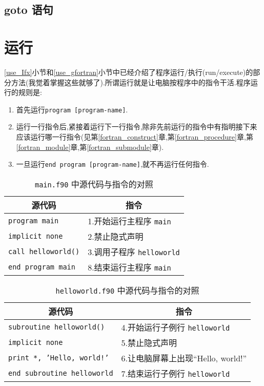 \subsection{goto 语句}

\section{运行}\label{run_fortran}


\ref{use_Ifx}小节和\ref{use_gfortran}小节中已经介绍了程序运行/执行(run/execute)的部分方法(我觉着掌握这些就够了).所谓运行就是让电脑按程序中的指令干活.程序运行的规则是:
\begin{enumerate}
    \item 首先运行\texttt{program [program-name]}.
    \item 运行一行指令后,紧接着运行下一行指令,除非先前运行的指令中有指明接下来应该运行哪一行指令(见第\ref{fortran_construct}章,第\ref{fortran_procedure}章,第\ref{fortran_module}章,第\ref{fortran_submodule}章).
    \item 一旦运行\texttt{end program [program-name]},就不再运行任何指令.
\end{enumerate}

\begin{table}[!htbp]
    \centering
    \begin{tabular}{|p{}|p{}|}
        \hline
        \multicolumn{1}{|c|}{源代码}&\multicolumn{1}{|c|}{指令}\\
        \hline
        \texttt{program main}&1.开始运行主程序 \texttt{main}\\
        \hline
        \texttt{implicit none}&2.禁止隐式声明\\
        \hline
        \texttt{call helloworld()}&3.调用子程序 \texttt{helloworld}\\
        \hline
        \texttt{end program main}&8.结束运行主程序 \texttt{main}\\
        \hline
    \end{tabular}
    \caption{\texttt{main.f90} 中源代码与指令的对照}
\end{table}
\begin{table}[!htbp]
    \centering
    \begin{tabular}{|p{}|p{}|}
        \hline
        \multicolumn{1}{|c|}{源代码}&\multicolumn{1}{|c|}{指令}\\
        \hline
        \texttt{subroutine helloworld()}&4.开始运行子例行 \texttt{helloworld}\\
        \hline
        \texttt{implicit none}&5.禁止隐式声明\\
        \hline
        \texttt{print *, 'Hello, world!'}&6.让电脑屏幕上出现``Hello, world!''\\
        \hline
        \texttt{end subroutine helloworld}&7.结束运行子例行 \texttt{helloworld}\\
        \hline
    \end{tabular}
    \caption{\texttt{helloworld.f90} 中源代码与指令的对照}
\end{table}

